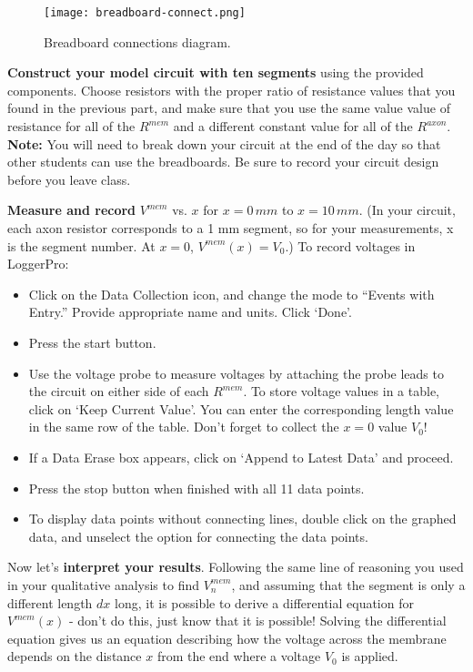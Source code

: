 \begin{figure}[hbtp]
	\centering
	\texttt{[image: breadboard-connect.png]}
	\caption{Breadboard connections diagram.}
	\label{fig:breadboard}
\end{figure}

\textbf{Construct your model circuit with ten segments} using the provided components.
Choose resistors with the proper ratio of resistance values that you found in the previous part, and make sure that you use the same value value of resistance for all of the $R^{mem}$ and a different constant value for all of the $R^{axon}$.
\textbf{Note:} You will need to break down your circuit at the end of the day so that other students can use the breadboards. Be sure to record your circuit design before you leave class.
\par 
\textbf{Measure and record} $V^{mem}$ vs. $x$ for $x = 0 \, mm$ to $x = 10 \, mm$.
(In your circuit, each axon resistor corresponds to a 1 mm segment, so for your measurements, x is the segment number.
At $x=0$, $V^{mem}(x)=V_{0}$.)
To record voltages in LoggerPro:
\begin{itemize}
\itemsep-0.2em
\item Click on the Data Collection icon, and change the mode to ``Events with Entry.'' Provide appropriate name and units. Click `Done'.
\item Press the start button.
\item Use the voltage probe to measure voltages by attaching the probe leads to the circuit on either side of each $R^{mem}$. To store voltage values in a table, click on `Keep Current Value'. You can enter the corresponding length value in the same row of the table. Don't forget to collect the $x=0$ value $V_{0}$!
\item If a Data Erase box appears, click on `Append to Latest Data' and proceed.
\item Press the stop button when finished with all 11 data points.
\item To display data points without connecting lines, double click on the graphed data, and unselect the option for connecting the data points.
\end{itemize}
Now let's \textbf{interpret your results}.
Following the same line of reasoning you used in your qualitative analysis to find $V^{mem}_{n}$, and assuming that the segment is only a different length $dx$ long, it is possible to derive a differential equation for $V^{mem}(x)$ - don't do this, just know that it is possible!
Solving the differential equation gives us an equation describing how the voltage across the membrane depends on the distance $x$ from the end where a voltage $V_{0}$ is applied.
